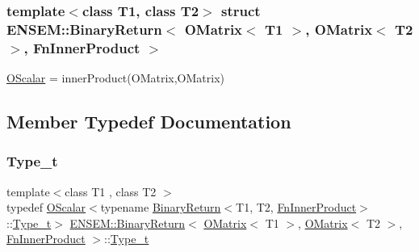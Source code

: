 \subsubsection*{template$<$class T1, class T2$>$\newline
struct E\+N\+S\+E\+M\+::\+Binary\+Return$<$ O\+Matrix$<$ T1 $>$, O\+Matrix$<$ T2 $>$, Fn\+Inner\+Product $>$}

\mbox{\hyperlink{classENSEM_1_1OScalar}{O\+Scalar}} = inner\+Product(\+O\+Matrix,\+O\+Matrix) 

\subsection{Member Typedef Documentation}
\mbox{\label{structENSEM_1_1BinaryReturn_3_01OMatrix_3_01T1_01_4_00_01OMatrix_3_01T2_01_4_00_01FnInnerProduct_01_4_a28a5e6d9f636db51eb542a0a4602c034}} 
\subsubsection{\texorpdfstring{Type\_t}{Type\_t}\hspace{0.1cm}{\footnotesize\ttfamily [1/2]}}
{\footnotesize\ttfamily template$<$class T1 , class T2 $>$ \\
typedef \mbox{\hyperlink{classENSEM_1_1OScalar}{O\+Scalar}}$<$typename \mbox{\hyperlink{structENSEM_1_1BinaryReturn}{Binary\+Return}}$<$T1, T2, \mbox{\hyperlink{structENSEM_1_1FnInnerProduct}{Fn\+Inner\+Product}}$>$\+::\mbox{\hyperlink{structENSEM_1_1BinaryReturn_3_01OMatrix_3_01T1_01_4_00_01OMatrix_3_01T2_01_4_00_01FnInnerProduct_01_4_a28a5e6d9f636db51eb542a0a4602c034}{Type\+\_\+t}}$>$ \mbox{\hyperlink{structENSEM_1_1BinaryReturn}{E\+N\+S\+E\+M\+::\+Binary\+Return}}$<$ \mbox{\hyperlink{classENSEM_1_1OMatrix}{O\+Matrix}}$<$ T1 $>$, \mbox{\hyperlink{classENSEM_1_1OMatrix}{O\+Matrix}}$<$ T2 $>$, \mbox{\hyperlink{structENSEM_1_1FnInnerProduct}{Fn\+Inner\+Product}} $>$\+::\mbox{\hyperlink{structENSEM_1_1BinaryReturn_3_01OMatrix_3_01T1_01_4_00_01OMatrix_3_01T2_01_4_00_01FnInnerProduct_01_4_a28a5e6d9f636db51eb542a0a4602c034}{Type\+\_\+t}}}


